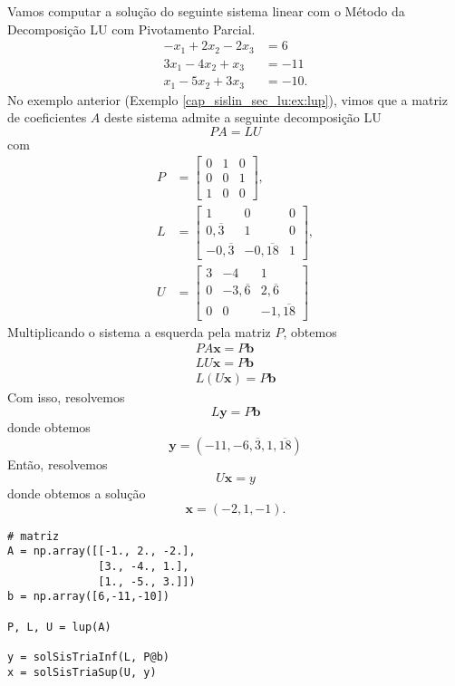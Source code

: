 \begin{ex}
  Vamos computar a solução do seguinte sistema linear com o Método da Decomposição LU com Pivotamento Parcial.
  \begin{align}
    -x_1 + 2x_2 - 2x_3 &= 6\\
    3x_1 - 4x_2 + x_3 &= -11\\
    x_1 - 5x_2 + 3x_3 &= -10.
  \end{align}
  No exemplo anterior (Exemplo \ref{cap_sislin_sec_lu:ex:lup}), vimos que a matriz de coeficientes $A$ deste sistema admite a seguinte decomposição LU
  \begin{equation}
    PA = LU
  \end{equation}
  com
  \begin{align}
    P &=
    \begin{bmatrix}
      0 & 1 & 0\\
      0 & 0 & 1\\
      1 & 0 & 0
    \end{bmatrix},\\
    L &=
    \begin{bmatrix}
      1 & 0 & 0\\
      0,\overline{3} & 1 & 0\\
      -0,\overline{3} & -0,\overline{18} & 1      
    \end{bmatrix},\\
    U &= 
    \begin{bmatrix}
      3 & -4 & 1\\
      0 & -3,\overline{6} & 2,\overline{6}\\
      0 & 0 & -1,\overline{18}
    \end{bmatrix}
  \end{align}
  Multiplicando o sistema a esquerda pela matriz $P$, obtemos
  \begin{gather}
    PA\pmb{x} = P\pmb{b}\\
    LU\pmb{x} = P\pmb{b}\\
    L(U\pmb{x}) = P\pmb{b}
  \end{gather}
  Com isso, resolvemos
  \begin{equation}
    L\pmb{y} = P\pmb{b}
  \end{equation}
  donde obtemos
  \begin{equation}
    \pmb{y} = (-11, -6,\overline{3}, 1,\overline{18})
  \end{equation}
  Então, resolvemos
  \begin{equation}
    U\pmb{x} = y
  \end{equation}
  donde obtemos a solução
  \begin{equation}
    \pmb{x} = (-2, 1, -1).
  \end{equation}
  
\begin{lstlisting}
# matriz
A = np.array([[-1., 2., -2.],
              [3., -4., 1.],
              [1., -5., 3.]])
b = np.array([6,-11,-10])

P, L, U = lup(A)

y = solSisTriaInf(L, P@b)
x = solSisTriaSup(U, y)
\end{lstlisting}

\end{ex}

